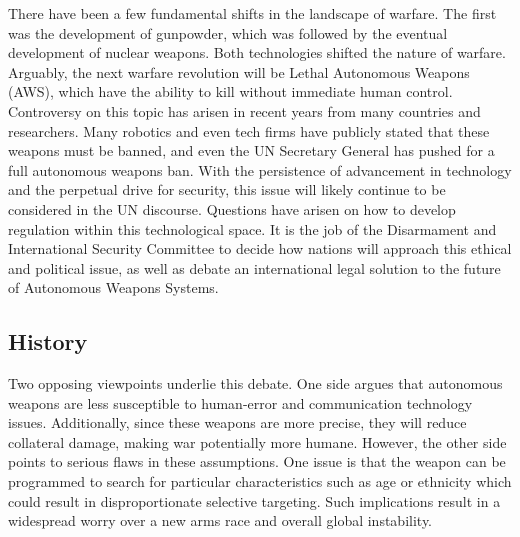 \documentclass[10pt, letterpaper]{article}
\begin{document}
There have been a few fundamental shifts in the
landscape of warfare. The first was the development of gunpowder, which
was followed by the eventual development of nuclear weapons. Both
technologies shifted the nature of warfare. Arguably, the next warfare
revolution will be Lethal Autonomous Weapons (AWS), which have the
ability to kill without immediate human control. Controversy on this
topic has arisen in recent years from many countries and researchers.
Many robotics and even tech firms have publicly stated that these
weapons must be banned, and even the UN Secretary General has pushed for
a full autonomous weapons ban. With the persistence of advancement in
technology and the perpetual drive for security, this issue will likely
continue to be considered in the UN discourse. Questions have arisen on
how to develop regulation within this technological space. It is the job
of the Disarmament and International Security Committee to decide how
nations will approach this ethical and political issue, as well as
debate an international legal solution to the future of Autonomous
Weapons Systems.

\subsection{History}

Two opposing viewpoints underlie this debate. One side argues that
autonomous weapons are less susceptible to human-error and communication
technology issues. Additionally, since these weapons are more precise,
they will reduce collateral damage, making war potentially more humane.
However, the other side points to serious flaws in these assumptions.
One issue is that the weapon can be programmed to search for particular
characteristics such as age or ethnicity which could result in
disproportionate selective targeting. Such implications result in a
widespread worry over a new arms race and overall global instability. \\
\end{document}
